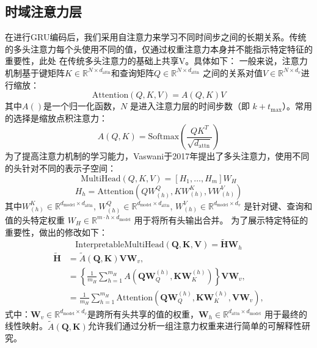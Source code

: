 \subsection{时域注意力层}
在进行GRU编码后，我们采用自注意力来学习不同时间步之间的长期关系。传统的多头注意力每个头使用不同的值，仅通过权重注意力本身并不能指示特定特征的重要性，此处
在传统多头注意力的基础上共享V。具体如下：
一般来说，注意力机制基于键矩阵\( K \in \mathbb{R}^{N \times d_{\text{attn}}} \)和查询矩阵\( Q \in \mathbb{R}^{N \times d_{\text{attn}}} \)
之间的关系对值\( V \in \mathbb{R}^{N \times d_v} \)进行缩放：
\begin{equation}
    \text{Attention}(Q, K, V) = A(Q,K)V
\end{equation}
其中$A()$是一个归一化函数，\( N \) 是进入注意力层的时间步数（即 \( k + t_{\text{max}} \)）。常用的选择是缩放点积注意力：
\begin{equation}
    A(Q, K) = \text{Softmax}\left(\frac{QK^T}{\sqrt{d_{\text{attn}}}}\right)
\end{equation}
为了提高注意力机制的学习能力，Vaswani于2017年提出了多头注意力，使用不同的头针对不同的表示子空间：
\begin{equation}
    \text{MultiHead}(Q, K, V) = [H_1, \ldots, H_m]W_H
\end{equation}
\begin{equation}
    H_h = \text{Attention}(QW^Q_{(h)}, KW^K_{(h)}, VW^V_{(h)})
\end{equation}
其中\( W^K_{(h)} \in \mathbb{R}^{d_{\text{model}} \times d_{\text{attn}}} \), \( W^Q_{(h)} \in \mathbb{R}^{d_{\text{model}} \times d_{\text{attn}}} \), \( W^V_{(h)} \in \mathbb{R}^{d_{\text{model}} \times d_v} \) 
是针对键、查询和值的头特定权重 \( W_H \in \mathbb{R}^{m \cdot h \times d_{\text{model}}} \) 用于将所有头输出合并。
为了展示特定特征的重要性，做出的修改如下：
\begin{equation}
    \text{InterpretableMultiHead}(\mathbf{Q}, \mathbf{K}, \mathbf{V}) = \tilde{\mathbf{H}} \mathbf{W}_h
\end{equation}
\begin{equation}
    \begin{aligned}
        \mathbf{\tilde{H}} &= \tilde{A}(\mathbf{Q}, \mathbf{K}) \mathbf{V} \mathbf{W}_v, \\
        &= \left\{ \frac{1}{m_H} \sum_{h=1}^{m_H} A(\mathbf{Q} \mathbf{W}_Q^{(h)}, \mathbf{K} \mathbf{W}_K^{(h)}) \right\} \mathbf{V} \mathbf{W}_v, \\
        &= \frac{1}{m_H} \sum_{h=1}^{m_H} \text{Attention}(\mathbf{Q} \mathbf{W}_Q^{(h)}, \mathbf{K} \mathbf{W}_K^{(h)}, \mathbf{V} \mathbf{W}_v),
    \end{aligned}        
\end{equation}
式中：$\mathbf{W}_v \in \mathbb{R}^{d_{\text{model}} \times d_v}$是跨所有头共享的值的权重，$\mathbf{W}_h \in \mathbb{R}^{d_{\text{attn}} \times d_{\text{model}}}$
用于最终的线性映射。$\tilde{A}(\mathbf{Q}, \mathbf{K})$允许我们通过分析一组注意力权重来进行简单的可解释性研究。

